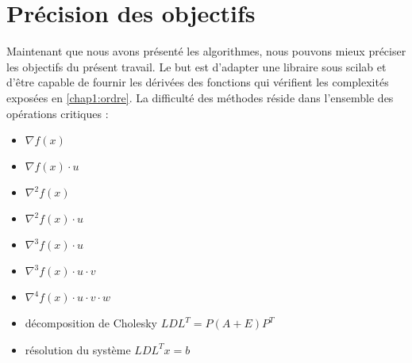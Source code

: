 




%
%
%
%
%
%
%





\section{Pr\'ecision des objectifs}
Maintenant que nous avons pr\'esent\'e les algorithmes, nous pouvons mieux pr\'eciser les objectifs du pr\'esent travail.
Le but est d'adapter une libraire sous scilab et d'être capable de fournir les d\'eriv\'ees des fonctions qui v\'erifient
les complexit\'es expos\'ees en \ref{chap1:ordre}.
La difficult\'e des m\'ethodes r\'eside dans l'ensemble des op\'erations critiques :
\begin{itemize}
\item $\nabla f(x)$
\item $\nabla f(x)\cdot u$
\item $\nabla^2 f(x)$
\item $\nabla^2 f(x)\cdot u$
\item $\nabla^3 f(x)\cdot u$
\item $\nabla^3 f(x)\cdot u\cdot v$
\item $\nabla^4 f(x)\cdot u\cdot v \cdot w$
\item d\'ecomposition de Cholesky $LDL^T = P(A+E)P^T$
\item r\'esolution du syst\`eme $LDL^Tx =b$
\end{itemize}

